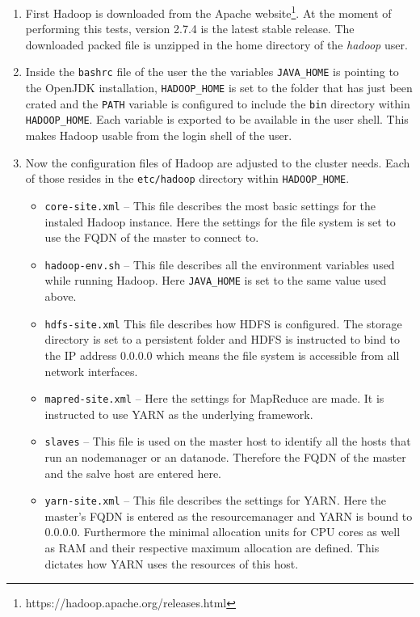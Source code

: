 \begin{enumerate}
    \item First Hadoop is downloaded from the Apache website\footnote{https://hadoop.apache.org/releases.html}. 
    At the moment of performing this tests, 
    version 2.7.4 is the latest stable release.
    The downloaded packed file is unzipped in the home directory of the \emph{hadoop} user.
    \item Inside the \texttt{bashrc} file of the user the the variables \texttt{JAVA\_HOME} is pointing to the OpenJDK installation,
    \texttt{HADOOP\_HOME} is set to the folder that has just been crated and the \texttt{PATH} variable is configured to include the \texttt{bin} directory within \texttt{HADOOP\_HOME}.
    Each variable is exported to be available in the user shell.
    This makes Hadoop usable from the login shell of the user.
    \item Now the configuration files of Hadoop are adjusted to the cluster needs. Each of those resides in the \texttt{etc/hadoop} directory within \texttt{HADOOP\_HOME}.
    \begin{itemize}
        \item \texttt{core-site.xml} -- This file describes the most basic settings for the instaled Hadoop instance. 
        Here the settings for the file system is set to use the \ac{FQDN} of the master to connect to.
        \item \texttt{hadoop-env.sh} -- This file describes all the environment variables used while running Hadoop. 
        Here \texttt{JAVA\_HOME} is set to the same value used above.
        \item \texttt{hdfs-site.xml} This file describes how \ac{HDFS} is configured. 
        The storage directory is set to a persistent folder
        and \ac{HDFS} is instructed to bind to the \ac{IP} address 0.0.0.0 
        which means the file system is accessible from all network interfaces.
        \item \texttt{mapred-site.xml} -- Here the settings for MapReduce are made. 
        It is instructed to use \ac{YARN} as the underlying framework.
        \item \texttt{slaves} -- This file is used on the master host to identify all the hosts 
        that run an nodemanager or an datanode.
        Therefore the \acs{FQDN} of the master and the salve host are entered here.
        \item \texttt{yarn-site.xml} -- This file describes the settings for \ac{YARN}. Here the master's \ac{FQDN} is entered as the resourcemanager and \ac{YARN} is bound to 0.0.0.0. 
        Furthermore the minimal allocation units for \ac{CPU} cores 
        as well as \ac{RAM} and their respective maximum allocation are defined. 
        This dictates how \ac{YARN} uses the resources of this host.
    \end{itemize}
\end{enumerate}

